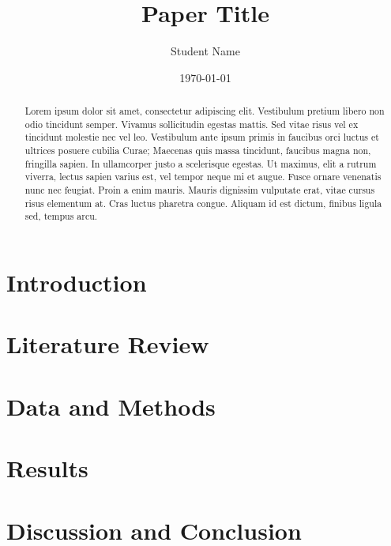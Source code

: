 \documentclass{article}
\title{Paper Title}
\author{Student Name}
\date{\today}
\begin{document}
\maketitle

\begin{abstract}
Lorem ipsum dolor sit amet, consectetur adipiscing elit. Vestibulum pretium libero non odio tincidunt semper. Vivamus sollicitudin egestas mattis. Sed vitae risus vel ex tincidunt molestie nec vel leo. Vestibulum ante ipsum primis in faucibus orci luctus et ultrices posuere cubilia Curae; Maecenas quis massa tincidunt, faucibus magna non, fringilla sapien. In ullamcorper justo a scelerisque egestas. Ut maximus, elit a rutrum viverra, lectus sapien varius est, vel tempor neque mi et augue. Fusce ornare venenatis nunc nec feugiat. Proin a enim mauris. Mauris dignissim vulputate erat, vitae cursus risus elementum at. Cras luctus pharetra congue. Aliquam id est dictum, finibus ligula sed, tempus arcu. 
\end{abstract} \hspace{10pt}

\section{Introduction}


\section{Literature Review}


\section{Data and Methods}


\section{Results}


\section{Discussion and Conclusion}

\end{document}
